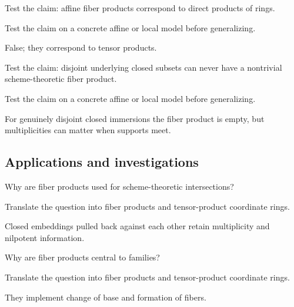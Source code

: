 \begin{exercise}\label{exr:vi23-expand-11}
Test the claim: affine fiber products correspond to direct products of rings.
\end{exercise}
\begin{hint}
Test the claim on a concrete affine or local model before generalizing.
\end{hint}
\begin{solution}
False; they correspond to tensor products.
\end{solution}

\begin{exercise}\label{exr:vi23-expand-12}
Test the claim: disjoint underlying closed subsets can never have a nontrivial scheme-theoretic fiber product.
\end{exercise}
\begin{hint}
Test the claim on a concrete affine or local model before generalizing.
\end{hint}
\begin{solution}
For genuinely disjoint closed immersions the fiber product is empty, but multiplicities can matter when supports meet.
\end{solution}

\subsection*{Applications and investigations}

\begin{exercise}[Intersections]\label{exr:vi23-expand-13}
Why are fiber products used for scheme-theoretic intersections?
\end{exercise}
\begin{hint}
Translate the question into fiber products and tensor-product coordinate rings.
\end{hint}
\begin{solution}
Closed embeddings pulled back against each other retain multiplicity and nilpotent information.
\end{solution}

\begin{exercise}[Families]\label{exr:vi23-expand-14}
Why are fiber products central to families?
\end{exercise}
\begin{hint}
Translate the question into fiber products and tensor-product coordinate rings.
\end{hint}
\begin{solution}
They implement change of base and formation of fibers.
\end{solution}


